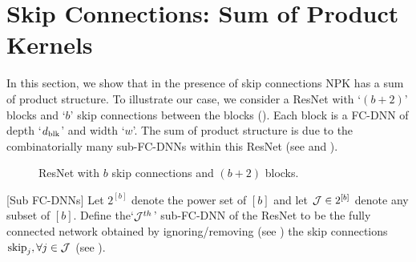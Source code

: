\section{Skip Connections: Sum of Product Kernels}
In this section, we show that in the presence of skip connections NPK has a sum of product structure. To illustrate our case, we consider a ResNet with `$(b+2)$' blocks and `$b$' skip connections between the blocks (). Each block is a FC-DNN of depth `$d_{\text{blk}}$' and width `$w$'. The sum of product structure is due to the combinatorially many sub-FC-DNNs within this ResNet (see  and ).
\FloatBarrier
\begin{figure}[h]
\caption{\small{ResNet with $b$ skip connections and $(b+2)$ blocks.}}
\label{fig:resnet}
\end{figure}
\begin{definition}\label{def:subfcdnn}[Sub FC-DNNs]
Let $2^{[b]}$ denote the power set of $[b]$ and let $\mathcal{J}\in 2^{[b]}$ denote any subset of $[b]$. Define the`$\mathcal{J}^{th}$' sub-FC-DNN of the ResNet to be the fully connected network obtained by ignoring/removing (see ) the skip connections $\text{skip}_j,\forall j\in \mathcal{J}$ (see ).
\end{definition}
\FloatBarrier
